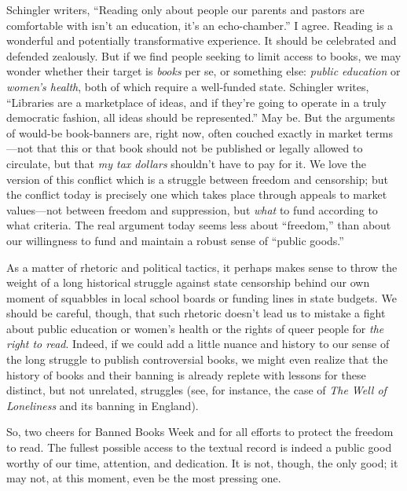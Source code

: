\documentclass[
  12pt,
]{article}
\begin{document}
Schingler writers, ``Reading only about people our parents and pastors
are comfortable with isn't an education, it's an echo-chamber.'' I
agree. Reading is a wonderful and potentially transformative experience.
It should be celebrated and defended zealously. But if we find people
seeking to limit access to books, we may wonder whether their target is
\emph{books} per se, or something else: \emph{public education} or
\emph{women's health}, both of which require a well-funded state.
Schingler writes, ``Libraries are a marketplace of ideas, and if they're
going to operate in a truly democratic fashion, all ideas should be
represented.'' May be. But the arguments of would-be book-banners are,
right now, often couched exactly in market terms---not that this or that
book should not be published or legally allowed to circulate, but that
\emph{my tax dollars} shouldn't have to pay for it. We love the version
of this conflict which is a struggle between freedom and censorship; but
the conflict today is precisely one which takes place through appeals to
market values---not between freedom and suppression, but \emph{what} to
fund according to what criteria. The real argument today seems less
about ``freedom,'' than about our willingness to fund and maintain a
robust sense of ``public goods.''

As a matter of rhetoric and political tactics, it perhaps makes sense to
throw the weight of a long historical struggle against state censorship
behind our own moment of squabbles in local school boards or funding
lines in state budgets. We should be careful, though, that such rhetoric
doesn't lead us to mistake a fight about public education or women's
health or the rights of queer people for \emph{the right to read}.
Indeed, if we could add a little nuance and history to our sense of the
long struggle to publish controversial books, we might even realize that
the history of books and their banning is already replete with lessons
for these distinct, but not unrelated, struggles (see, for instance, the
case of \emph{The Well of Loneliness} and its banning in England).

So, two cheers for Banned Books Week and for all efforts to protect the
freedom to read. The fullest possible access to the textual record is
indeed a public good worthy of our time, attention, and dedication. It
is not, though, the only good; it may not, at this moment, even be the
most pressing one.
\end{document}
